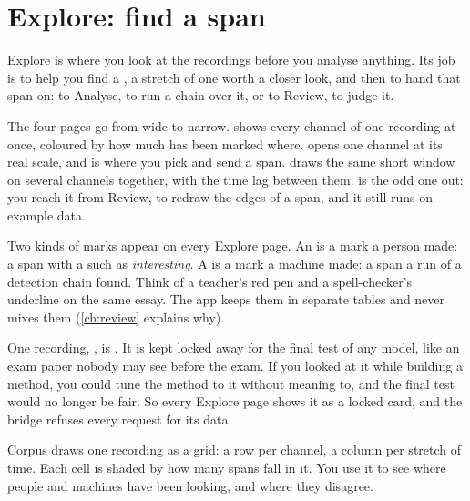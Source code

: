 \chapter{Explore: find a span}\label{ch:explore}
Explore is where you look at the recordings before you analyse anything. Its job is to help
you find a , a stretch of one  worth a closer look, and
then to hand that span on: to Analyse, to run a chain over it, or to Review, to judge it.

The four pages go from wide to narrow.  shows every channel of one
recording at once, coloured by how much has been marked where.  opens
one channel at its real scale, and is where you pick and send a span.
 draws the same short window on several channels together,
with the time lag between them.  is the odd one out: you reach it
from Review, to redraw the edges of a span, and it still runs on example data.

\begin{plainterms}
Two kinds of marks appear on every Explore page. An  is a mark a
person made: a span with a  such as \emph{interesting}. A
 is a mark a machine made: a span a run of a detection chain
found. Think of a teacher's red pen and a spell-checker's underline on the same essay. The
app keeps them in separate tables and never mixes them (\cref{ch:review} explains why).
\end{plainterms}

\begin{plainterms}
One recording, , is . It is kept
locked away for the final test of any model, like an exam paper nobody may see before the
exam. If you looked at it while building a method, you could tune the method to it without
meaning to, and the final test would no longer be fair. So every Explore page shows it as a
locked card, and the bridge refuses every request for its data.
\end{plainterms}

Corpus draws one recording as a grid: a row per channel, a column per stretch of time. Each
cell is shaded by how many spans fall in it. You use it to see where people and machines
have been looking, and where they disagree.

